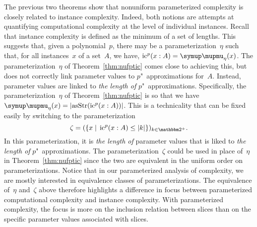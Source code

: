 The previous two theorems show that nonuniform parameterized complexity is closely related to instance complexity.
Indeed, both notions are attempts at quantifying computational complexity at the level of individual instances.
Recall that instance complexity is defined as the minimum of a set of lengths.
This suggests that, given a polynomial~$p$, there may be a parameterization~$\eta$ such that, for all instances~$x$ of a set~$A$, we have, $\ic^p(x : A) = \mu_\eta(x)$.
The parameterization~$\eta$ of Theorem~\ref{thm:nufptic} comes close to achieving this, but does not correctly link parameter values to $p$"~approximations for~$A$.
Instead, parameter values are linked to \emph{the length of} $p$"~approximations.
Specifically, the parameterization~$\eta$ of Theorem~\ref{thm:nufptic} is so that we have $\mu_\eta(x) = \length{\asStr(\ic^p(x : A))}$.
This is a technicality that can be fixed easily by switching to the parameterization
\begin{equation*}
  \zeta \deq (\{x \st \ic^p(x : A) \le \length{k}\})_{k \in \binary^+}.
\end{equation*}
In this parameterization, it is \emph{the length of} parameter values that is liked to \emph{the length of} $p$"~approximations.
The parameterization~$\zeta$ could be used in place of~$\eta$ in Theorem~\ref{thm:nufptic} since the two are equivalent in the uniform order on parameterizations.
Notice that in our parameterized analysis of complexity, we are mostly interested in equivalence classes of parameterizations.
The equivalence of~$\eta$ and~$\zeta$ above therefore highlights a difference in focus between parameterized computational complexity and instance complexity.
With parameterized complexity, the focus is more on the inclusion relation between slices than on the specific parameter values associated with slices.

